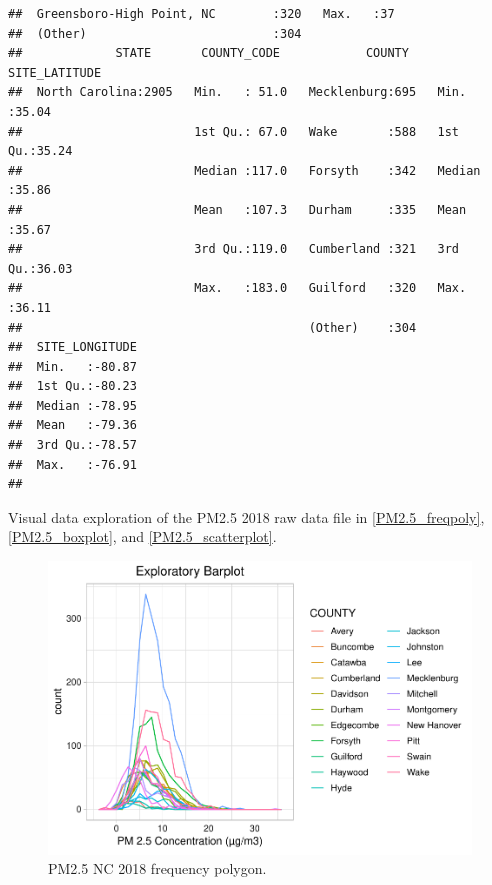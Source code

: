 \documentclass[12pt,]{article}
\begin{document}
\begin{verbatim}
##  Greensboro-High Point, NC        :320   Max.   :37  
##  (Other)                          :304               
##             STATE       COUNTY_CODE            COUNTY    SITE_LATITUDE  
##  North Carolina:2905   Min.   : 51.0   Mecklenburg:695   Min.   :35.04  
##                        1st Qu.: 67.0   Wake       :588   1st Qu.:35.24  
##                        Median :117.0   Forsyth    :342   Median :35.86  
##                        Mean   :107.3   Durham     :335   Mean   :35.67  
##                        3rd Qu.:119.0   Cumberland :321   3rd Qu.:36.03  
##                        Max.   :183.0   Guilford   :320   Max.   :36.11  
##                                        (Other)    :304                  
##  SITE_LONGITUDE  
##  Min.   :-80.87  
##  1st Qu.:-80.23  
##  Median :-78.95  
##  Mean   :-79.36  
##  3rd Qu.:-78.57  
##  Max.   :-76.91  
## 
\end{verbatim}

Visual data exploration of the PM2.5 2018 raw data file in
\autoref{PM2.5_freqpoly}, \autoref{PM2.5_boxplot}, and
\autoref{PM2.5_scatterplot}.

\begin{figure}
\centering
\includegraphics{./Outputunnamed-chunk-11-1.pdf}
\caption{PM2.5 NC 2018 frequency polygon. \label{PM2.5_freqpoly}}
\end{figure}
\end{document}
